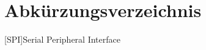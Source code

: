 \chapter*{Abkürzungsverzeichnis}
\begin{acronym}
		
	[SPI]{Serial Peripheral Interface}
\end{acronym}